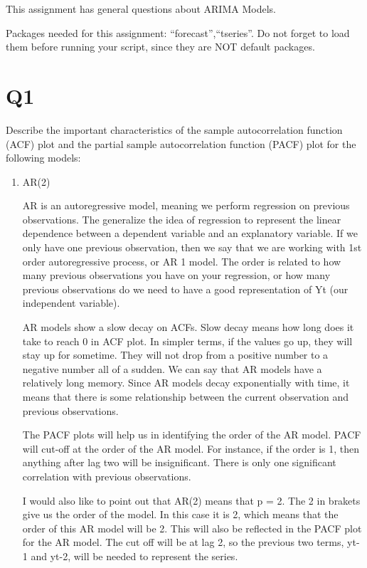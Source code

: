 \documentclass[
]{article}
\begin{document}
This assignment has general questions about ARIMA Models.

Packages needed for this assignment: ``forecast'',``tseries''. Do not
forget to load them before running your script, since they are NOT
default packages.

\hypertarget{q1}{%
\section{Q1}\label{q1}}

\medskip

Describe the important characteristics of the sample autocorrelation
function (ACF) plot and the partial sample autocorrelation function
(PACF) plot for the following models:

\begin{enumerate}[label=(\alph*)]

\item AR(2)

AR is an autoregressive model, meaning we perform regression on previous observations. The generalize the idea of regression to represent the linear dependence between a dependent variable and an explanatory variable. If we only have one previous observation, then we say that we are working with 1st order autoregressive process, or AR 1 model. The order is related to how many previous observations you have on your regression, or how many previous observations do we need to have a good representation of Yt (our independent variable). 

AR models show a slow decay on ACFs. Slow decay means how long does it take to reach 0 in ACF plot. In simpler terms, if the values go up, they will stay up for sometime. They will not drop from a positive number to a negative number all of a sudden. We can say that AR models have a relatively long memory. Since AR models decay exponentially with time, it means that there is some relationship between the current observation and previous observations. 

The PACF plots will help us in identifying the order of the AR model. PACF will cut-off at the order of the AR model. For instance, if the order is 1, then anything after lag two will be insignificant. There is only one significant correlation with previous observations.

I would also like to point out that AR(2) means that p = 2. The 2 in brakets give us the order of the model. In this case it is 2, which means that the order of this AR model will be 2. This will also be reflected in the PACF plot for the AR model. The cut off will be at lag 2, so the previous two terms, yt-1 and yt-2, will be needed to represent the series.


\end{enumerate}
\end{document}
